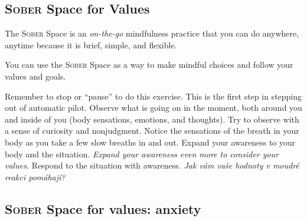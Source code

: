 	\clearpage
	\subsection{\textsc{Sober} Space for Values}
		The \textsc{Sober} Space is an \emph{on-the-go} mindfulness practice that you can do anywhere, anytime because it is brief, simple, and flexible.

		You can use the \textsc{Sober} Space as a way to make mindful choices and follow your values and goals.

		\begin{itemize}[leftmargin=10mm]
			 Remember to stop or “pause” to do this exercise. This is the first step in stepping out of automatic pilot. 
			 Observe what is going on in the moment, both around you and inside of you (body sensations, emotions, and thoughts). Try to observe with a sense of curiosity and nonjudgment. 
			 Notice the sensations of the breath in your body as you take a few slow breaths in and out. 
			 Expand your awareness to your body and the situation. \emph{Expand your awareness even more to consider your values.}
			 Respond to the situation with awareness. \emph{Jak vám vaše hodnoty v moudré reakci pomáhají?}
		\end{itemize}
	\clearpage

	\subsection{\textsc{Sober} Space for values: anxiety}
	\clearpage
